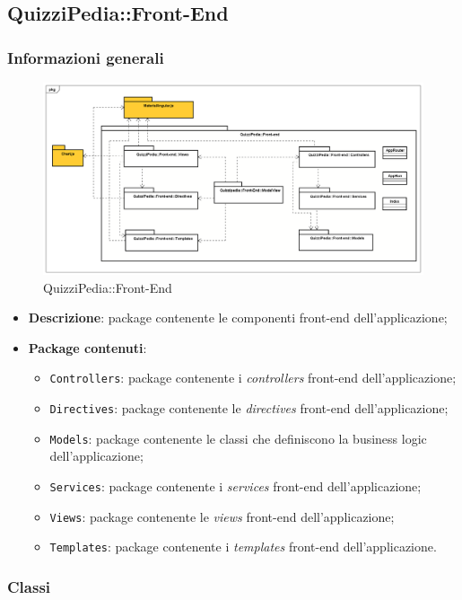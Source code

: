 \subsection{QuizziPedia::Front-End}
\subsubsection{Informazioni generali}
\label{QuizziPedia::Front-End}
\begin{figure}[ht]
	\centering
	\includegraphics[scale=0.35]{UML/Package/QuizziPedia_Front-end.png}
	\caption{QuizziPedia::Front-End}
\end{figure}
\FloatBarrier
	\begin{itemize}
		\item \textbf{Descrizione}: package contenente le componenti front-end dell'applicazione;
		\item \textbf{Package contenuti}:
		\begin{itemize}
			\item \texttt{Controllers}: package contenente i \textit{controllers} front-end dell'applicazione;
			\item \texttt{Directives}: package contenente le \textit{directives} front-end dell'applicazione;
			\item \texttt{Models}: package contenente le classi che definiscono la business logic dell'applicazione;
			\item \texttt{Services}: package contenente i \textit{services} front-end dell'applicazione;
			\item \texttt{Views}: package contenente le \textit{views} front-end dell'applicazione;
			\item \texttt{Templates}: package contenente i \textit{templates} front-end dell'applicazione.
		\end{itemize}
	\end{itemize}

\subsubsection{Classi}
	
	
	
